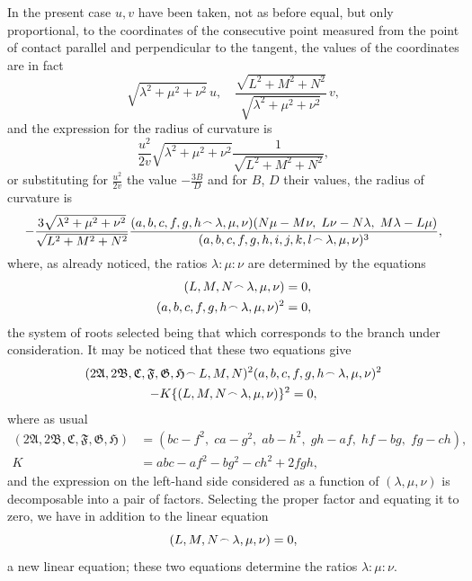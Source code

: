 \documentclass[11pt,a4paper]{book}
\begin{document}
In the present case $u, v$ have been taken, not as before equal, but only proportional, to the coordinates of the consecutive point measured from the point of contact parallel and perpendicular to the tangent, the values of the coordinates are in fact
\[
\sqrt{\lambda^2 + \mu^2 + \nu^2}\,u,\quad \frac{\sqrt{L^2 + M^2 + N^2}}{\sqrt{\lambda^2 + \mu^2 + \nu^2}}\,v,
\]
and the expression for the radius of curvature is
\[
\frac{u^2}{2v}\sqrt{\lambda^2 + \mu^2 + \nu^2}\frac{1}{\sqrt{L^2 + M^2 + N^2}},
\]
or substituting for $\frac{u^2}{2v}$ the value $-\frac{3B}{D}$ and for $B$, $D$ their values, the radius of curvature is
\[
-\frac{3\sqrt{\lambda^2 + \mu^2 + \nu^2}}{\sqrt{L^2 + M^2 + N^2}}\frac{(a, b, c, f, g, h \mathbin{\vcenter{\hbox{$\scriptstyle\!\frown$}}} \lambda, \mu, \nu)(N\mu - M\nu,\; L\nu - N\lambda,\; M\lambda - L\mu)}{(a, b, c, f, g, h, i, j, k, l \mathbin{\vcenter{\hbox{$\scriptstyle\!\frown$}}} \lambda, \mu, \nu)^3},
\]
where, as already noticed, the ratios $\lambda : \mu : \nu$ are determined by the equations
\begin{align*}
(L, M, N \mathbin{\vcenter{\hbox{$\scriptstyle\!\frown$}}} \lambda, \mu, \nu) &= 0,\\
(a, b, c, f, g, h \mathbin{\vcenter{\hbox{$\scriptstyle\!\frown$}}} \lambda, \mu, \nu)^2 &= 0,
\end{align*}
the system of roots selected being that which corresponds to the branch under consideration. It may be noticed that these two equations give
\begin{multline*}
(2\mathfrak{A}, 2\mathfrak{B}, \mathfrak{C}, \mathfrak{F}, \mathfrak{G}, \mathfrak{H} \mathbin{\vcenter{\hbox{$\scriptstyle\!\frown$}}} L, M, N)^2(a, b, c, f, g, h \mathbin{\vcenter{\hbox{$\scriptstyle\!\frown$}}} \lambda, \mu, \nu)^2\\
- K\{(L, M, N \mathbin{\vcenter{\hbox{$\scriptstyle\!\frown$}}} \lambda, \mu, \nu)\}^2 = 0,
\end{multline*}
where as usual
\begin{align*}
(2\mathfrak{A}, 2\mathfrak{B}, \mathfrak{C}, \mathfrak{F}, \mathfrak{G}, \mathfrak{H}) &= (bc - f^2,\; ca - g^2,\; ab - h^2,\; gh - af,\; hf - bg,\; fg - ch),\\
K &= abc - af^2 - bg^2 - ch^2 + 2fgh,
\end{align*}
and the expression on the left-hand side considered as a function of $(\lambda, \mu, \nu)$ is decomposable into a pair of factors. Selecting the proper factor and equating it to zero, we have in addition to the linear equation
\[
(L, M, N \mathbin{\vcenter{\hbox{$\scriptstyle\!\frown$}}} \lambda, \mu, \nu) = 0,
\]
a new linear equation; these two equations determine the ratios $\lambda : \mu : \nu$.
\end{document}
